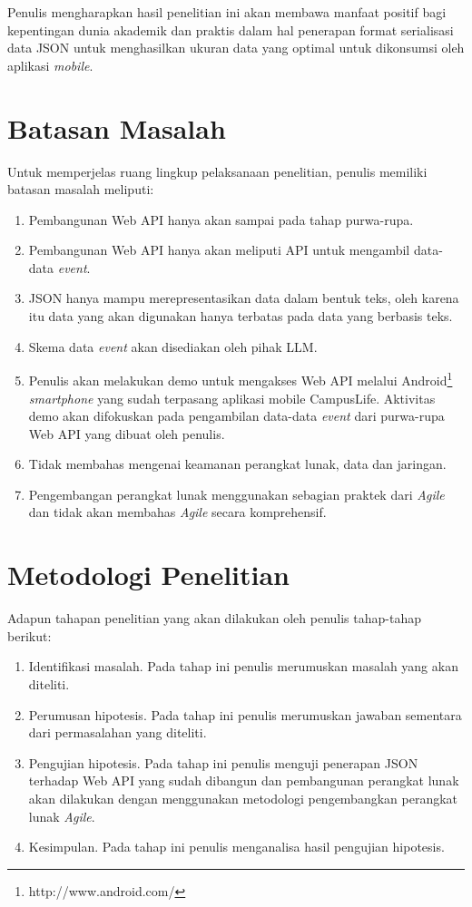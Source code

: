 \documentclass[a4paper, 12pt]{report}
\begin{document}
\onehalfspacing Penulis mengharapkan hasil penelitian ini akan membawa manfaat positif bagi kepentingan dunia akademik dan praktis dalam hal penerapan format serialisasi data JSON untuk menghasilkan ukuran data yang optimal untuk dikonsumsi oleh aplikasi \textit{mobile}.

\section{Batasan Masalah}
\onehalfspacing Untuk memperjelas ruang lingkup pelaksanaan penelitian, penulis memiliki batasan masalah meliputi:
\onehalfspacing
\begin{enumerate}
  \item Pembangunan Web API hanya akan sampai pada tahap purwa-rupa.
  \item Pembangunan Web API hanya akan meliputi API untuk mengambil data-data \textit{event}.
  \item JSON hanya mampu merepresentasikan data dalam bentuk teks, oleh karena itu data yang akan digunakan hanya terbatas pada data yang berbasis teks.
  \item Skema data \textit{event} akan disediakan oleh pihak LLM.
  \item Penulis akan melakukan demo untuk mengakses Web API melalui Android\footnote{http://www.android.com/} \textit{smartphone} yang sudah terpasang aplikasi mobile CampusLife. Aktivitas demo akan difokuskan pada pengambilan  data-data \textit{event} dari purwa-rupa Web API yang dibuat oleh penulis.
  \item Tidak membahas mengenai keamanan perangkat lunak, data dan jaringan.
  \item Pengembangan perangkat lunak menggunakan sebagian praktek dari \textit{Agile} dan tidak akan membahas \textit{Agile} secara komprehensif.
\end{enumerate}

\section{Metodologi Penelitian}
\onehalfspacing Adapun tahapan penelitian yang akan dilakukan oleh penulis tahap-tahap berikut:
\begin{enumerate}
  \item Identifikasi masalah. Pada tahap ini penulis merumuskan masalah yang akan diteliti.
  \item Perumusan hipotesis. Pada tahap ini penulis merumuskan jawaban sementara dari permasalahan yang diteliti.
  \item Pengujian hipotesis. Pada tahap ini penulis menguji penerapan JSON terhadap Web API yang sudah dibangun dan pembangunan perangkat lunak akan dilakukan dengan menggunakan metodologi pengembangkan perangkat lunak \textit{Agile}. 
  \item Kesimpulan. Pada tahap ini penulis menganalisa hasil pengujian hipotesis.
\end{enumerate}
\end{document}
